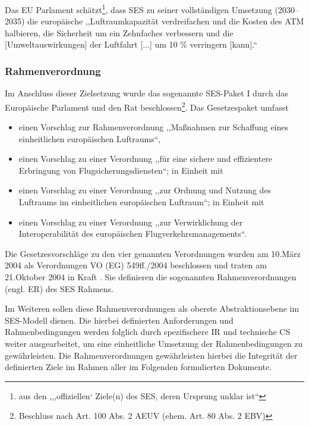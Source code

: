     \medskip
    Das \acs{EU} Parlament schätzt\footnote{aus den ,,,offiziellen` Ziele(n) des \ac{SES}, deren Ursprung unklar ist``\cite{eu_parl_ses}}, dass \ac{SES} zu seiner vollständigen Umsetzung (2030--2035) die europäische ,,Luftraumkapazität verdreifachen und die Kosten des \ac{ATM} halbieren, die Sicherheit um ein Zehnfaches verbessern und die [Umweltauswirkungen] der Luftfahrt [...] um 10 \% verringern [kann].`` 
    \cite{eu_parl_ses} 


\subsubsection{Rahmenverordnung}

    Im Anschluss dieser Zielsetzung wurde das sogenannte \acs{SES}-Paket I durch das Europäische Parlament und den Rat beschlossen\footnote{Beschluss nach Art. 100 Abs. 2 AEUV (ehem. Art. 80 Abs. 2 EBV)}.
    Das Gesetzespaket umfasst 
    
    \begin{itemize}
        \item einen Vorschlag zur Rahmenverordnung ,,Maßnahmen zur Schaffung eines einheitlichen europäischen Luftraums``\cite{kom_01_564, kom_01_123},
        \item einen Vorschlag zu einer Verordnung ,,für eine sichere und effizientere Erbringung von Flugsicherungsdiensten``\cite{kom_01_564_1}; in Einheit mit
        \item  einen Vorschlag zu einer Verordnung ,,zur Ordnung und Nutzung des Luftraums im einheitlichen europäischen Luftraum``\cite{kom_01_564_2}; in Einheit mit
        \item  einen Vorschlag zu einer Verordnung ,,zur Verwirklichung der Interoperabilität des europäischen Flugverkehrsmanagements``\cite{kom_01_564_3}.
    \end{itemize}

    \medskip
    Die Gesetzesvorschläge zu den vier genannten Verordnungen wurden am 10.März 2004 als Verordnungen \acs{VO} (\acs{EG})  549ff./2004 beschlossen und traten am 21.Oktober 2004 in Kraft \cite[S.12]{eu_ses_studie}.
    Sie definieren die sogenannten Rahmenverordnungen (engl. \acf{ER}) des \ac{SES} Rahmens.

    \medskip
    Im Weiteren sollen diese Rahmenverordnungen als oberste Abstraktionsebene im \ac{SES}-Modell dienen. 
    Die hierbei definierten Anforderungen und Rahmenbedingungen werden folglich durch spezifischere \acf{IR} und technische \acf{CS} weiter ausgearbeitet, um eine einheitliche Umsetzung der Rahmenbedingungen zu gewährleisten.
    Die Rahmenverordnungen gewährleisten hierbei die Integrität der definierten Ziele im Rahmen aller im Folgenden formulierten Dokumente.
    
    
